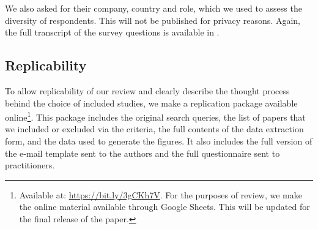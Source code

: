 We also asked for their company, country and role, which we used to assess the diversity of respondents. This will not be published for privacy reasons.
Again, the full transcript of the survey questions is available in .

\subsection{Replicability}
\label{subsec:replicability}

To allow replicability of our review and clearly describe the thought process behind the choice of included studies, we make a replication package available online\footnote{Available at: \url{https://bit.ly/3gCKh7V}.
For the purposes of review, we make the online material available through Google Sheets. This will be updated for the final release of the paper.}.
This package includes the original search queries, the list of papers that we included or excluded via the criteria, the full contents of the data extraction form, and the data used to generate the figures.
It also includes the full version of the e-mail template sent to the authors and the full questionnaire sent to practitioners.